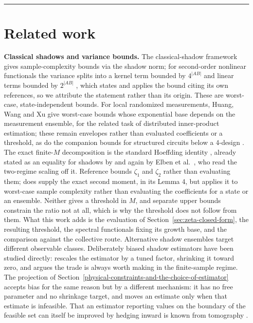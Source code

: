 \documentclass[a4paper,superscriptaddress,nofootinbib,onecolumn,nopdfoutputerror]{quantumarticle}
\begin{document}
\begin{center}\rule{0.5\linewidth}{0.5pt}\end{center}

\hypertarget{related-work}{%
\section{Related work}\label{related-work}}

\textbf{Classical shadows and variance bounds.} The classical-shadow
framework \cite{huang2020shadows} gives sample-complexity bounds via the
shadow norm; for second-order nonlinear functionals the variance splits
into a kernel term bounded by \(4^{|AB|}\) and linear terms bounded by
\(2^{|AB|}\) \cite{shadownorm2021}, which states and applies the bound
citing its own references, so we attribute the statement rather than its
origin. These are worst-case, state-independent bounds. For local
randomized measurements, Huang, Wang and Xu \cite{huang2026worstcase} give
worst-case bounds whose exponential base depends on the measurement
ensemble, for the related task of distributed inner-product estimation;
these remain envelopes rather than evaluated coefficients or a threshold,
as do the companion bounds for structured circuits below a 4-design
\cite{zheng2026structured}.
The exact finite-\(M\) decomposition is the standard Hoeffding identity
\cite{hoeffding1948, serfling1980}, already stated as an equality for
shadows by \cite{huang2020shadows} and again by Elben et
al.~\cite{elben2020mixed}, who read the two-regime scaling off it.
Reference \cite{elben2020mixed} bounds \(\zeta_1\) and \(\zeta_2\) rather
than evaluating them; \cite{huang2020shadows} does supply the exact second
moment, in its Lemma 4, but applies it to worst-case sample complexity
rather than evaluating the coefficients for a state or an ensemble.
Neither gives a threshold in \(M\), and separate upper bounds constrain
the ratio not at all, which is why the threshold does not follow from
them. What this work adds is the evaluation of
Section~\ref{sec:zeta-closed-form}, the resulting threshold, the spectral
functionals fixing its growth base, and the comparison against the
collective route. Alternative shadow ensembles
\cite{hamiltonianshadow2021} target different observable classes.
Deliberately biased shadow estimators have been studied directly:
\cite{cai2025biased} rescales the estimator by a tuned factor, shrinking it
toward zero, and argues the trade is always worth making in the
finite-sample regime. The projection of
Section~\ref{physical-constraints-and-the-choice-of-estimator} accepts bias
for the same reason but by a different mechanism: it has no free parameter
and no shrinkage target, and moves an estimate only when that estimate is
infeasible. That an estimator reporting values on the boundary of the
feasible set can itself be improved by hedging inward is known from
tomography \cite{ferrie2018inadmissible}.
\end{document}
